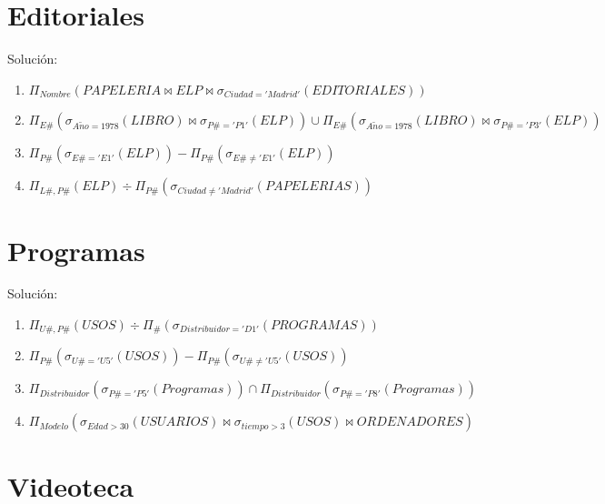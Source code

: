 \documentclass[a4paper]{article}
\begin{document}
\section{Editoriales}

Solución:

\begin{enumerate}
    \item $\Pi_{Nombre} \left( PAPELERIA \bowtie ELP \bowtie \sigma_{Ciudad='Madrid'} \left( EDITORIALES \right) \right)$
    \item $\Pi_{E\#} \left( \sigma_{A\tilde{n}o=1978} \left( LIBRO \right) \bowtie \sigma_{P\#='P1'} \left( ELP \right) \right) \cup \Pi_{E\#} \left( \sigma_{A\tilde{n}o=1978} \left( LIBRO \right) \bowtie \sigma_{P\#='P3'} \left( ELP \right) \right)$
    \item $\Pi_{P\#} \left( \sigma_{E\#='E1'} \left( ELP \right) \right) - \Pi_{P\#} \left( \sigma_{E\# \neq 'E1'} \left( ELP \right) \right)$
    \item $\Pi_{L\#,P\#} \left( ELP \right) \div \Pi_{P\#} \left( \sigma_{Ciudad \neq 'Madrid'} \left( PAPELERIAS \right) \right)$
\end{enumerate}

\section{Programas}

Solución:

\begin{enumerate}
    \item $\Pi_{U\#, P\#} \left( USOS \right) \div \Pi_{\#} \left( \sigma_{Distribuidor='D1'} \left( PROGRAMAS \right) \right)$
    \item $\Pi_{P\#} \left( \sigma_{U\#='U5'} \left( USOS \right)\right) - \Pi_{P\#} \left( \sigma_{U\#\neq'U5'} \left( USOS \right)\right)$
    \item $\Pi_{Distribuidor} \left( \sigma_{P\#='P5'} \left( Programas \right) \right) \cap \Pi_{Distribuidor} \left( \sigma_{P\#='P8'} \left( Programas \right) \right)$
    \item $\Pi_{Modelo} \left( \sigma_{Edad > 30} \left( USUARIOS \right) \bowtie \sigma_{tiempo > 3} \left( USOS \right) \bowtie ORDENADORES \right)$
\end{enumerate}

\section{Videoteca}
\end{document}
